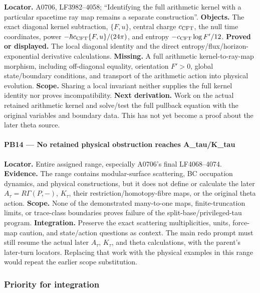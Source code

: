 \textbf{Locator.} A0706, LF3982--4058; ``Identifying the full arithmetic
kernel with a particular spacetime ray map remains a separate
construction''. \textbf{Objects.} The exact diagonal kernel subtraction,
\(\{F,u\}\), central charge \(c_{\rm CFT}\), the null time coordinates,
power \(-\hbar c_{\rm CFT}\{F,u\}/(24\pi)\), and entropy
\(-c_{\rm CFT}\log F'/12\). \textbf{Proved or displayed.} The local
diagonal identity and the direct entropy/flux/horizon-exponential
derivative calculations. \textbf{Missing.} A full arithmetic
kernel-to-ray-map morphism, including off-diagonal equality, orientation
\(F'>0\), global state/boundary conditions, and transport of the
arithmetic action into physical evolution. \textbf{Scope.} Sharing a
local invariant neither supplies the full kernel identity nor proves
incompatibility. \textbf{Next derivation.} Work on the actual retained
arithmetic kernel and solve/test the full pullback equation with the
original variables and boundary data. This has not yet become a proof
about the later theta source.

\paragraph{PB14 --- No retained physical obstruction reaches
A\_tau/K\_tau}\label{TranscriptLedgerStage:pb14-no-retained-physical-obstruction-reaches-a_tauk_tau}

\textbf{Locator.} Entire assigned range, especially A0706's final
LF4068--4074. \textbf{Evidence.} The range contains modular-surface
scattering, BC occupation dynamics, and physical constructions, but it
does not define or calculate the later \(A_\tau=R\Gamma(P,-)\),
\(K_\tau\), their restriction/homotopy-fibre maps, or the original theta
action. \textbf{Scope.} None of the demonstrated many-to-one maps,
finite-truncation limits, or trace-class boundaries proves failure of
the split-base/privileged-tau program. \textbf{Integration.} Preserve
the exact scattering multiplicities, units, force-map caution, and
state/action questions as context. The main redo prompt must still
resume the actual later \(A_\tau\), \(K_\tau\), and theta calculations,
with the parent's later-turn locators. Replacing that work with the
physical examples in this range would repeat the earlier scope
substitution.

\subsubsection{Priority for integration}\label{TranscriptLedgerStage:priority-for-integration}


